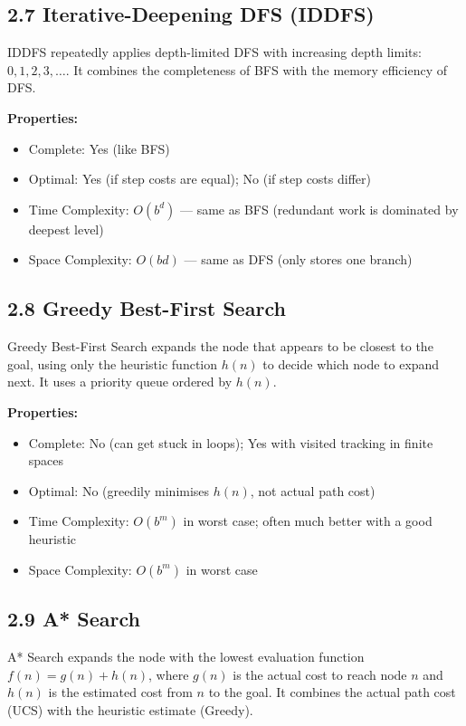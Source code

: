 \documentclass[12pt,a4paper]{article}
\begin{document}
\subsection*{2.7 Iterative-Deepening DFS (IDDFS)}

IDDFS repeatedly applies depth-limited DFS with increasing depth limits: $0, 1, 2, 3, \dots$. It combines the completeness of BFS with the memory efficiency of DFS.

\textbf{Properties:}
\begin{itemize}[leftmargin=1.4em]
  \item Complete: Yes (like BFS)
  \item Optimal: Yes (if step costs are equal); No (if step costs differ)
  \item Time Complexity: $O(b^d)$ --- same as BFS (redundant work is dominated by deepest level)
  \item Space Complexity: $O(bd)$ --- same as DFS (only stores one branch)
\end{itemize}

\subsection*{2.8 Greedy Best-First Search}

Greedy Best-First Search expands the node that appears to be closest to the goal, using only the heuristic function $h(n)$ to decide which node to expand next. It uses a priority queue ordered by $h(n)$.

\textbf{Properties:}
\begin{itemize}[leftmargin=1.4em]
  \item Complete: No (can get stuck in loops); Yes with visited tracking in finite spaces
  \item Optimal: No (greedily minimises $h(n)$, not actual path cost)
  \item Time Complexity: $O(b^m)$ in worst case; often much better with a good heuristic
  \item Space Complexity: $O(b^m)$ in worst case
\end{itemize}

\subsection*{2.9 A* Search}

A* Search expands the node with the lowest evaluation function $f(n) = g(n) + h(n)$, where $g(n)$ is the actual cost to reach node $n$ and $h(n)$ is the estimated cost from $n$ to the goal. It combines the actual path cost (UCS) with the heuristic estimate (Greedy).
\end{document}
